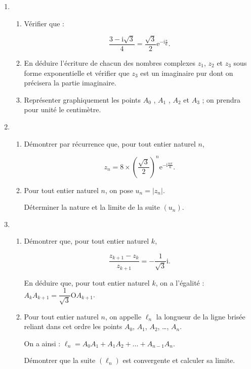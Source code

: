 \documentclass[10pt]{article}
\begin{document}
\begin{enumerate}
\item 
	\begin{enumerate}
		\item Vérifier que :
		
\[\dfrac{3 - \text{i}\sqrt{3}}{4} = \dfrac{\sqrt{3}}{2}\text{e}^{- \text{i}\frac{\pi}{6}}.\]
		
		\item En déduire l'écriture de chacun des nombres complexes $z_1$,  $z_2$ et $z_3$ sous forme exponentielle et vérifier que $z_3$ est un imaginaire pur dont on précisera la partie imaginaire.
		\item Représenter graphiquement les points $A_0$ , $A_1$ , $A_2$ et $A_3$ ; on prendra pour unité le centimètre.
 	\end{enumerate}
\item
	\begin{enumerate}
		\item Démontrer par récurrence que, pour tout entier naturel $n$,
		
\[z_n = 8 \times \left(\dfrac{\sqrt{3}}{2}\right)^n \text{e}^{- \text{i}\frac{n\pi}{6}}.\]
		
		\item Pour tout entier naturel $n$, on pose $u_n = \left|z_n\right|$.
		
Déterminer la nature et la limite de la suite $\left(u_n\right)$.
	\end{enumerate}
\item 
	\begin{enumerate}
		\item Démontrer que, pour tout entier naturel $k$,
		
		\[\dfrac{z_{k+1} - z_{k}}{z_{k+1}} = - \dfrac{1}{\sqrt{3}}\text{i}.\]

En déduire que, pour tout entier naturel $k$, on a l'égalité : $A_kA_{k+1} = \dfrac{1}{\sqrt{3}} \text{O}A_{k+1}$.
		\item Pour tout entier naturel $n$, on appelle $\ell_n$ la longueur de la ligne brisée reliant dans cet ordre les points $A_0$,\: $A_1$,\: $A_2$, \ldots , $A_n$.
		
On a ainsi : $\ell_n = A_0A_1 + A_1A_2 + \ldots + A_{n-1}A_n$.
		
Démontrer que la suite $\left(\ell_n\right)$ est convergente et calculer sa limite.
	\end{enumerate}
\end{enumerate}

\vspace{0,5cm}
\end{document}
